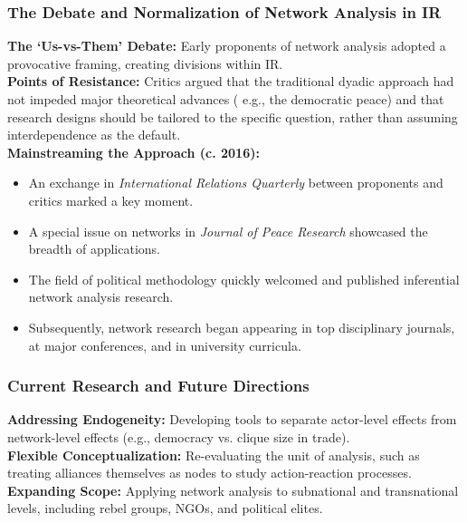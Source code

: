 \documentclass{article}
\begin{document}
    \subsubsection{The Debate and Normalization of Network Analysis in IR}
    \noindent \textbf{The `Us-vs-Them' Debate:} Early proponents of network
analysis adopted a provocative framing, creating divisions within IR.\\

    \noindent \textbf{Points of Resistance:} Critics argued that the
traditional dyadic approach had not impeded major theoretical advances (
e.g., the democratic peace) and that research designs should be tailored to
the specific question, rather than assuming interdependence as the default.\\

    \noindent \textbf{Mainstreaming the Approach (c. 2016):}
    \begin{itemize}
        \item An exchange in \textit{International Relations Quarterly}
        between proponents and critics marked a key moment.
        \item A special issue on networks in
        \textit{Journal of Peace Research} showcased the breadth of
        applications.
        \item The field of political methodology quickly welcomed and
        published inferential network analysis research.
        \item Subsequently, network research began appearing in top
        disciplinary journals, at major conferences, and in university
        curricula.
    \end{itemize}

    \subsubsection{Current Research and Future Directions}
    \noindent \textbf{Addressing Endogeneity:} Developing tools to separate
actor-level effects from network-level effects (e.g., democracy vs. clique
size in trade).\\

    \noindent \textbf{Flexible Conceptualization:} Re-evaluating the unit of
analysis,
such as treating alliances themselves as nodes to study action-reaction
processes.\\

    \noindent \textbf{Expanding Scope:} Applying network analysis to
subnational and transnational levels, including rebel groups, NGOs, and
political elites.\\
\end{document}
